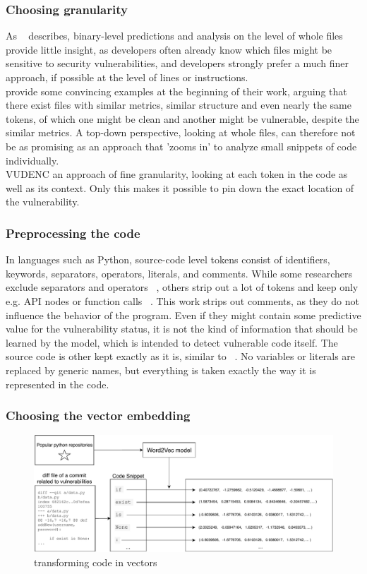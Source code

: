 \documentclass[
a4paper,
pagesize,
pdftex,
12pt,
twoside, %
BCOR=5mm, %
ngerman,
fleqn,
final,
]{scrartcl}
\begin{document}
	\subsubsection{Choosing granularity}
	As ~\cite{Morrison.2015} describes, binary-level predictions and analysis on the level of whole files provide little insight, as developers often already know which files might be sensitive to security vulnerabilities, and developers strongly prefer a much finer approach, if possible at the level of lines or instructions.\\
	\cite{Dam.2017} provide some convincing examples at the beginning of their work, arguing that there exist files with similar metrics, similar structure and even nearly the same tokens, of which one might be clean and another might be vulnerable, despite the similar metrics. A top-down perspective, looking at whole files, can therefore not be as promising as an approach that 'zooms in' to analyze small snippets of code individually.\\
	VUDENC an approach of fine granularity, looking at each token in the code as well as its context. Only this makes it possible to pin down the exact location of the vulnerability. 
	
	\subsubsection{Preprocessing the code}
	In languages such as Python, source-code level tokens consist of identifiers, keywords, separators, operators, literals, and comments. While some researchers exclude separators and operators ~\cite{Pang.2015}, others strip out a lot of tokens and keep only e.g. API nodes or function calls ~\cite{Yamaguchi.2012}. This work strips out comments, as they do not influence the behavior of the program. Even if they might contain some predictive value for the vulnerability status, it is not the kind of information that should be learned by the model, which is intended to detect vulnerable code itself. The source code is other kept exactly as it is, similar to  ~\cite{Hovsepyan.2012}. No variables or literals are replaced by generic names, but everything is taken  exactly the way it is represented in the code. 
	
	\subsubsection{Choosing the vector embedding}
	\begin{figure}[ht]
		\centering
		\includegraphics[width=\linewidth]{img/Word2Vec}
		\caption{transforming code in vectors}
		\label{fig:word2vec}
	\end{figure}
	
\end{document}
